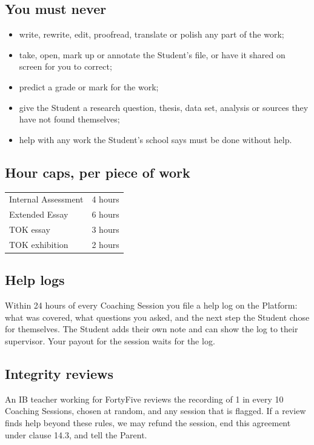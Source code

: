\documentclass[11pt]{article}
\begin{document}
\subsection*{You must never}
\begin{itemize}
  \item write, rewrite, edit, proofread, translate or polish any part of the work;
  \item take, open, mark up or annotate the Student's file, or have it shared on screen for you to correct;
  \item predict a grade or mark for the work;
  \item give the Student a research question, thesis, data set, analysis or sources they have not found themselves;
  \item help with any work the Student's school says must be done without help.
\end{itemize}

\subsection*{Hour caps, per piece of work}

\noindent\begin{tabular}{@{}l r@{}}
\toprule
Internal Assessment & 4 hours \\
Extended Essay & 6 hours \\
TOK essay & 3 hours \\
TOK exhibition & 2 hours \\
\bottomrule
\end{tabular}

\subsection*{Help logs}

Within 24 hours of every Coaching Session you file a help log on the Platform: what was covered, what questions you asked, and the next step the Student chose for themselves. The Student adds their own note and can show the log to their supervisor. Your payout for the session waits for the log.

\subsection*{Integrity reviews}

An IB teacher working for FortyFive reviews the recording of 1 in every 10 Coaching Sessions, chosen at random, and any session that is flagged. If a review finds help beyond these rules, we may refund the session, end this agreement under clause 14.3, and tell the Parent.
\end{document}
